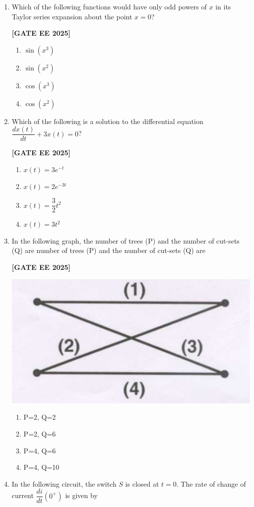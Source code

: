 \documentclass[12pt]{article}
\begin{document}
\begin{enumerate}[leftmargin=2.5em, label=\textbf{Q.\arabic*}., itemsep=2em]
\item Which of the following functions would have only odd powers of $x$ in its Taylor series expansion about the point $x = 0$?
 
\noindent \textbf{[GATE EE 2025]}
    \begin{enumerate}
        \item $\sin(x^3)$
        \item $\sin(x^2)$
        \item $\cos(x^3)$
        \item $\cos(x^2)$
    \end{enumerate}

\item Which of the following is a solution to the differential equation $\dfrac{dx(t)}{dt} + 3x(t) = 0$?
 
\noindent \textbf{[GATE EE 2025]}
    \begin{enumerate}
        \item $x(t) = 3e^{-t}$
        \item $x(t) = 2e^{-3t}$
        \item $x(t) = \dfrac{3}{2} t^2$
        \item $x(t) = 3t^2$
    \end{enumerate}

\item In the following graph, the number of trees (P) and the number of cut-sets (Q) are
number of trees (P) and the number of cut-sets (Q) are
 
\noindent \textbf{[GATE EE 2025]}
\begin{center}
\includegraphics[width=0.5\columnwidth]{figs/q7.png}
\end{center}
    \begin{enumerate}
        \item P=2, Q=2
        \item P=2, Q=6
        \item P=4, Q=6
        \item P=4, Q=10
    \end{enumerate}

\item In the following circuit, the switch $S$ is closed at $t = 0$. The rate of change of current $\dfrac{di}{dt}(0^+)$ is given by
 

\end{enumerate}
\end{document}
